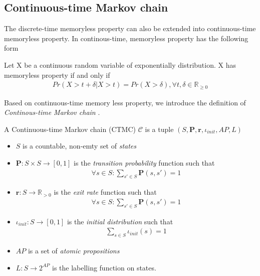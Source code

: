 \subsection{Continuous-time Markov chain}
The discrete-time memoryless property can also be extended into continuous-time memoryless property.
In continous-time, memoryless property has the following form
\begin{definition}
    Let X be a continuous random variable of exponentially distribution. X has memoryless property
    if and only if
    \begin{align*}
        Pr(X > t + \delta | X > t) = Pr(X > \delta), \forall t,\delta \in \mathbb{R}_{\geq 0}
    \end{align*}
\end{definition}
Based on continuous-time memory less property, we introduce the definition of \textit{Continous-time
    Markov chain} \cite{katoen2013model}.
\begin{definition}
    A Continuous-time Markov chain (CTMC) $\mathcal{C}$ is a tuple $(S,\mathbf{P}, \mathbf{r}, \iota_{init}, AP, L)$
    \begin{itemize}
        \item $S$ is a countable, non-emty set of \textit{states}
        \item $\mathbf{P}:S\times S \rightarrow [0,1]$ is the \textit{transition probability}
              function such that
              \begin{align*}
                  \forall s \in S : \sum_{s'\in S}\mathbf{P}(s, s') = 1
              \end{align*}
        \item $\mathbf{r}:S \rightarrow \mathbb{R}_{>0}$ is the \textit{exit rate} function
              such that
              \begin{align*}
                  \forall s \in S : \sum_{s'\in S}\mathbf{P}(s, s') = 1
              \end{align*}
        \item $\iota_{init}: S \rightarrow [0,1]$ is the \textit{initial distribution} such that
              \begin{align*}
                  \sum_{s\in S}\iota_{init}(s) = 1
              \end{align*}
        \item $AP$ is a set of \textit{atomic propositions}
        \item $L: S \rightarrow 2^{AP}$ is the labelling function on states.
    \end{itemize}
\end{definition}

